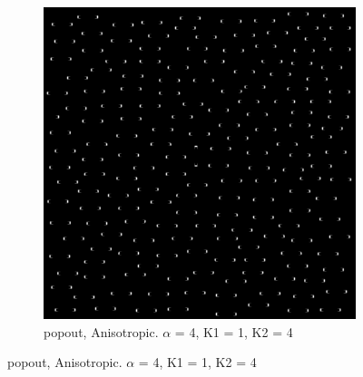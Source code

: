 \begin{figure}[H]
\centering 
  \begin{subfigure}{.7\textwidth}
    \centering
    \includegraphics[width=.9\textwidth]{./canny/popout_ANISO_a4_k11_k24}
    \caption{popout, Anisotropic. $\alpha$ = 4, K1 = 1, K2 = 4}
    \label{fig:popout_ANISO_a4_k11_k24}
  \end{subfigure}%
  
\end{figure}